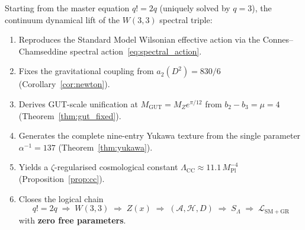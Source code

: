 \begin{tcolorbox}[colback=green!4!white,colframe=green!55!black,
  title=\textbf{Part~XXIII Closing Theorem}]
\begin{theorem}
\label{thm:closure:continuum}
Starting from the master equation $q!=2q$ (uniquely solved by $q=3$),
the continuum dynamical lift of the $W(3,3)$ spectral triple:
\begin{enumerate}[nosep]
  \item Reproduces the Standard Model Wilsonian effective action via the
        Connes--Chamseddine spectral action~\eqref{eq:spectral_action}.
  \item Fixes the gravitational coupling from $a_2(D^2)=830/6$
        (Corollary~\ref{cor:newton}).
  \item Derives GUT-scale unification at $M_\mathrm{GUT}=M_Z e^{\pi/12}$
        from $b_2-b_3=\mu=4$ (Theorem~\ref{thm:gut_fixed}).
  \item Generates the complete nine-entry Yukawa texture from the single
        parameter $\alpha^{-1}=137$ (Theorem~\ref{thm:yukawa}).
  \item Yields a $\zeta$-regularised cosmological constant
        $\Lambda_\mathrm{CC}\approx 11.1\,M_\mathrm{Pl}^{-4}$
        (Proposition~\ref{prop:cc}).
  \item Closes the logical chain
        \[
          q!=2q \;\Rightarrow\; W(3,3) \;\Rightarrow\; Z(x)
          \;\Rightarrow\; (\mathcal{A},\mathcal{H},D)
          \;\Rightarrow\; S_\Lambda \;\Rightarrow\; \mathcal{L}_\mathrm{SM+GR}
        \]
        with \textbf{zero free parameters}.
\end{enumerate}
\end{theorem}
\end{tcolorbox}
